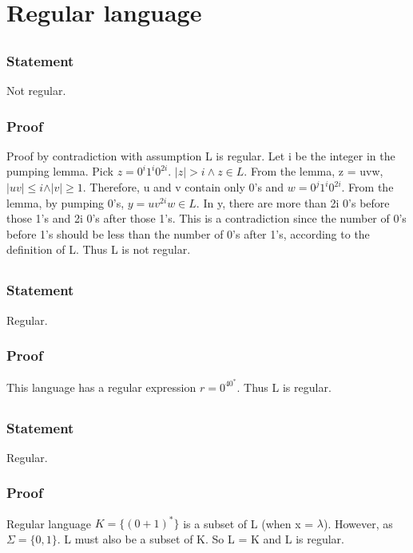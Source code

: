 \documentclass{article}
\begin{document}
\section{Regular language}
\subsection{}
\subsubsection{Statement}
Not regular.
\subsubsection{Proof}
Proof by contradiction with assumption L is regular. Let i be the integer in the
pumping lemma. Pick $z = 0^i1^i0^{2i}$. $\vert z \vert > i \land z \in L$. From
the lemma, z = uvw, $\vert uv \vert \leq i \land \vert v \vert \geq 1$.
Therefore, u and v contain only 0's and $w = 0^j1^i0^{2i}$. From
the lemma, by pumping 0's, $y = uv^{2i}w \in L$. In y, there are more than 2i
0's before those 1's and 2i 0's after those 1's. This is a contradiction since the number
of 0's before 1's should be less than the number of 0's after 1's, according to
the definition of L.
Thus L is not regular.
\subsection{}
\subsubsection{Statement}
Regular.
\subsubsection{Proof}
This language has a regular expression $r = 0^40^*$.
Thus L is regular.
\subsection{}
\subsubsection{Statement}
Regular.
\subsubsection{Proof}
Regular language $K = \{(0+1)^*\} $ is a subset of L (when x = $\lambda$).
However, as $\Sigma = \{0, 1\}$. L must also be a subset of K.
So L = K and L is regular.
\end{document}
